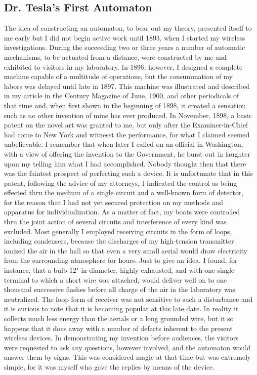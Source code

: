 \documentclass[a4paper,12pt,english,twoside,openright]{memoir}
\begin{document}
\subsection{Dr. Tesla's First Automaton}
The idea of constructing an automaton, to bear out my theory, presented itself to me early but I 
did not begin active work until 1893, when I started my wireless investigations.  During the 
succeeding two or three years a number of automatic mechanisms, to be actuated from a 
distance, were constructed by me and exhibited to visitors in my laboratory.  In 1896, however, I 
designed a complete machine capable of a multitude of operations, but the consummation of my 
labors was delayed until late in 1897.  This machine was illustrated and described in my article in 
the Century Magazine of June, 1900, and other periodicals of that time and, when first shown in 
the beginning of 1898, it created a sensation such as no other invention of mine has ever 
produced.  In November, 1898, a basic patent on the novel art was granted to me, but only after 
the Examiner-in-Chief had come to New York and witnesst the performance, for what I claimed 
seemed unbelievable.  I remember that when later I called on an official in Washington, with a 
view of offering the invention to the Government, he burst out in laughter upon my telling him 
what I had accomplished.  Nobody thought then that there was the faintest prospect of perfecting 
such a device.  It is unfortunate that in this patent, following the advice of my attorneys, I 
indicated the control as being effected thru the medium of a single circuit and a well-known form 
of detector, for the reason that I had not yet secured protection on my methods and apparatus for 
individualization.  As a matter of fact, my boats were controlled thru the joint action of several 
circuits and interference of every kind was excluded.  Most generally I employed receiving circuits 
in the form of loops, including condensers, because the discharges of my high-tension transmitter 
ionized the air in the hall so that even a very small aerial would draw electricity from the 
surrounding atmosphere for hours.  Just to give an idea, I found, for instance, that a bulb 12" in 
diameter, highly exhausted, and with one single terminal to which a short wire was attached, 
would deliver well on to one thousand successive flashes before all charge of the air in the 
laboratory was neutralized.  The loop form of receiver was not sensitive to such a disturbance 
and it is curious to note that it is becoming popular at this late date.  In reality it collects much less 
energy than the aerials or a long grounded wire, but it so happens that it does away with a 
number of defects inherent to the present wireless devices.  In demonstrating my invention before 
audiences, the visitors were requested to ask any questions, however involved, and the 
automaton would answer them by signs.  This was considered magic at that time but was 
extremely simple, for it was myself who gave the replies by means of the device.  
\end{document}
